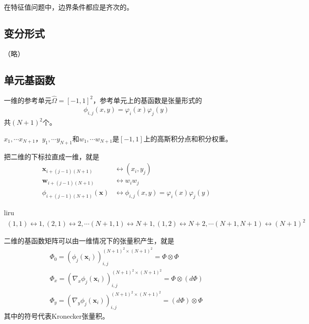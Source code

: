 \documentclass[12pt,a4paper]{article}
\begin{document}
在特征值问题中，边界条件都应是齐次的。

\subsection{变分形式}

（略）

\subsection{单元基函数}

一维的参考单元$\hat{\Omega} = [-1,1]^2$，参考单元上的基函数是张量形式的
\begin{align*}
\phi_{i,j}(x, y) = \varphi_i(x) \varphi_j(y)
\end{align*}
共$(N+1)^2$个。

$x_1, \cdots x_{N+1}$，$y_1, \cdots y_{N+1}$和$w_1, \cdots w_{N+1}$是$[-1, 1]$上的高斯积分点和积分权重。

把二维的下标拉直成一维，就是
\begin{align*}
\mathbf{x}_{i+(j-1)(N+1)} & \leftrightarrow (x_i, y_j) \\
\mathbf{w}_{i+(j-1)(N+1)} & \leftrightarrow w_i w_j \\
\phi_{i+(j-1)(N+1)}(\mathbf{x}) & \leftrightarrow \phi_{i,j}(x,y) = \varphi_i(x) \varphi_j(y)
\end{align*}

liru
\begin{align*}
(1,1) \leftrightarrow 1,
(2,1) \leftrightarrow 2, \cdots
(N+1,1) \leftrightarrow N+1,
(1,2) \leftrightarrow N+2, \cdots
(N+1,N+1) \leftrightarrow (N+1)^2
\end{align*}


二维的基函数矩阵可以由一维情况下的张量积产生，就是
\begin{align*}
\Phi_0 = (\phi_j(\mathbf{x}_i))_{i,j}^{(N+1)^2 \times (N+1)^2}  = \Phi \otimes \Phi \\
\Phi_x = (\nabla_x \phi_j(\mathbf{x}_i))_{i,j}^{(N+1)^2 \times (N+1)^2}  = \Phi \otimes (d\Phi) \\
\Phi_y = (\nabla_y \phi_j(\mathbf{x}_i))_{i,j}^{(N+1)^2 \times (N+1)^2}  = (d\Phi) \otimes \Phi
\end{align*}
其中的符号代表Kronecker张量积。
\end{document}
